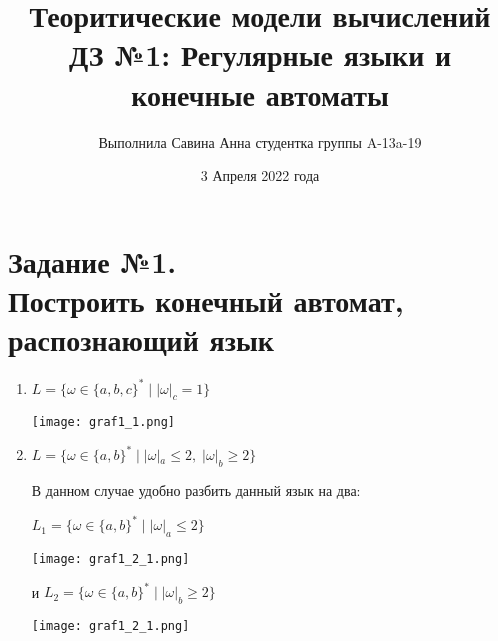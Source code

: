 \documentclass[12pt]{article}
\title{Теоритические модели вычислений\\ ДЗ №1: Регулярные языки и конечные автоматы}
\author{Выполнила Савина Анна студентка группы A-13a-19 }
\date{3 Апреля 2022 года}
\begin{document}
\maketitle

\section{Задание №1. \\ Построить конечный автомат, распознающий язык}
\begin{enumerate}
    \item $L = \{\omega \in \{a, b, c\}^* \; | \; |\omega|_c = 1 \}$
    \begin{center}
        \texttt{[image: graf1\_1.png]}
    \end{center}
\item $L = \{\omega \in \{a, b\}^* \; | \; |\omega|_a \leq 2, \; |\omega|_b \geq 2 \}$
    
    В данном случае удобно разбить данный язык на два:

    $L_1 = \{\omega \in \{a, b\}^* \; | \; |\omega|_a \leq 2 \}$
    \begin{center}
        \texttt{[image: graf1\_2\_1.png]}
    \end{center}
    и
    $L_2 = \{\omega \in \{a, b\}^* \; | \; |\omega|_b \geq 2\}$
    \begin{center}
        \texttt{[image: graf1\_2\_1.png]}
    \end{center}


\end{enumerate}
\end{document}
